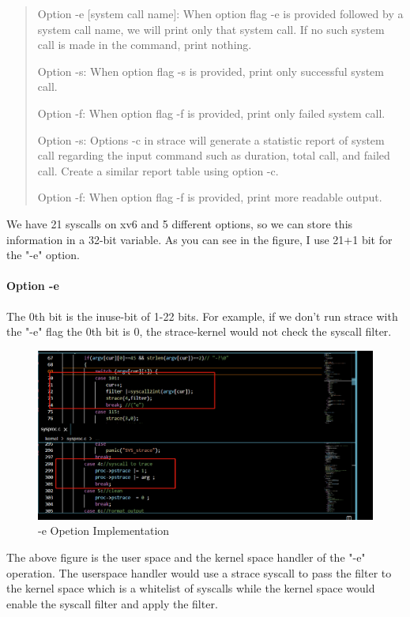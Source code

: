 \documentclass[11pt,oneside,a4paper]{article}
\begin{document}
\begin{quotation}
    Option -e [system call name]:
    When option flag -e is provided followed by a system call name, we will print only that
    system call. If no such system call is made in the command, print nothing.

    Option -s:
    When option flag -s is provided, print only successful system call.

    Option -f:
    When option flag -f is provided, print only failed system call.

    Option -s:
    Options -c in strace will generate a statistic report of system call regarding the input command
    such as duration, total call, and failed call. Create a similar report table using option -c.

    Option -f:
    When option flag -f is provided, print more readable output.

\end{quotation}

We have 21 syscalls on xv6 and 5 different options, so we can store this information
in a 32-bit variable. As you can see in the figure, I use 21+1 bit for the "-e" option. 


\paragraph*{Option -e}
The 0th bit is the inuse-bit of 1-22 bits. For example, if we don't run strace with
the "-e" flag the 0th bit is 0, the strace-kernel would not check the syscall filter.

\begin{figure}[H]
    \includegraphics[width=4.75in]{1-20.png}
    \centering
    \caption{-e Opetion Implementation}
\end{figure}

The above figure is the user space and the kernel space handler of the "-e" operation.
The userspace handler would use a strace syscall to pass the filter to the kernel space 
which is a whitelist of syscalls while the kernel space would enable the syscall filter 
and apply the filter. 
\end{document}
